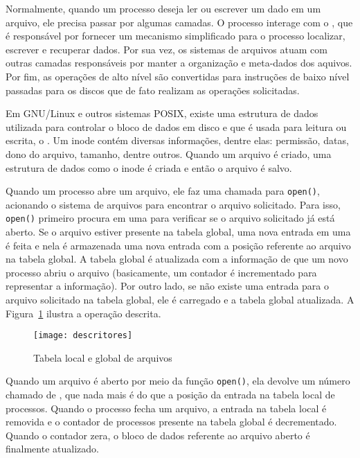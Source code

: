 Normalmente, quando um processo deseja ler ou escrever um dado em um arquivo,
ele precisa passar por algumas camadas. O processo interage com o
, que é responsável por fornecer um mecanismo
simplificado para o processo localizar, escrever e recuperar dados. Por sua
vez, os sistemas de arquivos atuam com outras camadas responsáveis por manter a
organização e meta-dados dos aquivos. Por fim, as operações de alto nível são
convertidas para instruções de baixo nível passadas para os discos que de fato
realizam as operações solicitadas.

Em GNU/Linux e outros sistemas POSIX, existe uma estrutura de dados utilizada
para controlar o bloco de dados em disco e que é usada para leitura ou escrita,
o . Um inode contém diversas informações, dentre elas:
permissão, datas, dono do arquivo, tamanho, dentre outros. Quando um arquivo é
criado, uma estrutura de dados como o inode é criada e então o arquivo é salvo.

Quando um processo abre um arquivo, ele faz uma chamada para \texttt{open()},
acionando o sistema de arquivos para encontrar o arquivo solicitado.
Para isso, \texttt{open()} primeiro procura em uma  para verificar se o arquivo solicitado já está aberto. Se o
arquivo estiver presente na tabela global, uma nova entrada em uma
 é feita e nela é
armazenada uma nova entrada com a posição referente ao arquivo na tabela
global. A tabela global é atualizada com a informação de que um novo processo
abriu o arquivo (basicamente, um contador é incrementado para representar a
informação). Por outro lado, se não existe uma entrada para o arquivo solicitado
na tabela global, ele é carregado e a tabela global atualizada. A
Figura~\ref{fig:descritores} ilustra a operação descrita.
 
\begin{figure}[!h]
  \centering
  \texttt{[image: descritores]} 
  \caption{Tabela local e global de arquivos}
  \label{fig:descritores} 
\end{figure}

Quando um arquivo é aberto por meio da função \texttt{open()}, ela devolve um
número chamado de ,
que nada mais é do que a posição da entrada na tabela local de processos.
Quando o processo fecha um arquivo, a entrada na tabela local é removida e o
contador de processos presente na tabela global é decrementado. Quando o
contador zera, o bloco de dados referente ao arquivo aberto é finalmente
atualizado.

